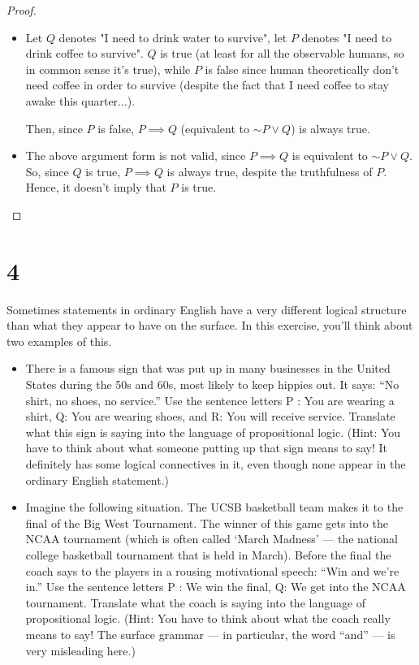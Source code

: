 \documentclass{article}
\begin{document}
\begin{proof}

    \hfill

    \begin{itemize}
        \item[a)] Let $Q$ denotes "I need to drink water to survive", let $P$ denotes "I need to drink coffee to survive". $Q$ is true (at least for all the observable humans, so in common sense it's true), while $P$ is false since human theoretically don't need coffee in order to survive (despite the fact that I need coffee to stay awake this quarter...).
        
        Then, since $P$ is false, $P\implies Q$ (equivalent to $\sim P\vee Q$) is always true.

        \hfill

        \item[b)] The above argument form is not valid, since $P\implies Q$ is equivalent to $\sim P \vee Q$. So, since $Q$ is true, $P\implies Q$ is always true, despite the truthfulness of $P$. Hence, it doesn't imply that $P$ is true.
    \end{itemize}
\end{proof}

\newpage

\section*{4}
\begin{ques}\label{q4}
Sometimes statements in ordinary English have a very different logical structure than what they appear to have on the surface. In this exercise, you’ll think about two examples of this.

\begin{itemize}
    \item[a)]There is a famous sign that was put up in many businesses in the United States during the 50s and 60s, most likely to keep hippies out. It says: “No shirt, no shoes, no service.” Use the sentence letters P : You are wearing a shirt, Q: You are wearing shoes, and R: You will receive service. Translate what this sign is saying into the language of propositional logic. (Hint: You have to think about what someone putting up that sign means to say! It definitely has some logical connectives in it, even though none appear in the ordinary English statement.)
    \item[b)] Imagine the following situation. The UCSB basketball team makes it to the final of the Big West Tournament. The winner of this game gets into the NCAA tournament (which is often called ‘March Madness’ — the national college basketball tournament that is held in March). Before the final the coach says to the players in a rousing motivational speech: “Win and we’re in.” Use the sentence letters P : We win the final, Q: We get into the NCAA tournament. Translate what the coach is saying into the language of propositional logic. (Hint: You have to think about what the coach really means to say! The surface grammar — in particular, the word “and” — is very misleading here.)
\end{itemize}
\end{ques}
\end{document}
